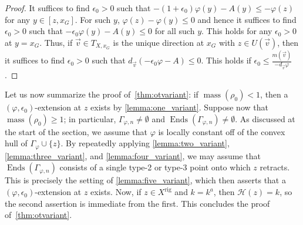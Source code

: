 \documentclass[10pt,reqno]{amsart}
\theoremstyle{plain}
\theoremstyle{definition}
\renewcommand{\H}{\mathcal{H}}
\numberwithin{equation}{section}
\DeclareMathOperator{\Ends}{Ends}
\DeclareMathOperator{\mass}{mass}
\DeclareMathOperator{\rig}{rig}
\begin{document}
\begin{proof}
It suffices to find $\epsilon_0 > 0$ such that $-(1+\epsilon_0)\varphi(y) -A(y) \leq -\varphi(z)$ for any $y \in [z,x_G]$. 
For such $y$, $\varphi(z) - \varphi(y) \leq 0$ and hence it suffices to find $\epsilon_0 > 0$ such that $-\epsilon_0 \varphi(y) - A(y) \leq 0$ for all such $y$.
This holds for any $\epsilon_0 > 0$ at $y= x_G$.
Thus, if $\vec{v} \in T_{X,x_G}$ is the unique direction at $x_G$ with $z \in U(\vec{v})$, then it suffices to find $\epsilon_0 > 0$ such that $d_{\vec{v}}\left( - \epsilon_0 \varphi - A \right) \leq 0$. This holds if $\epsilon_0 \leq \frac{m(\vec{v})}{-d_{\vec{v}} \varphi}$. 
\end{proof}

Let us now summarize the proof of~\cref{thm:otvariant}: 
if $\mass(\rho_0) < 1$, then a $(\varphi,\epsilon_0)$-extension at $z$ exists by \cref{lemma:one_variant}. Suppose now that $\mass(\rho_0) \geq 1$; in particular, $\Gamma_{\varphi,n} \not= \emptyset$ and $\Ends(\Gamma_{\varphi,n}) \not= \emptyset$. As discussed at the start of the section, we assume that $\varphi$ is locally constant off of the convex hull of $\Gamma_{\varphi} \cup \{ z \}$. By repeatedly applying \cref{lemma:two_variant},  \cref{lemma:three_variant}, and \cref{lemma:four_variant}, we may assume that $\Ends(\Gamma_{\varphi,n})$ consists of a single type-2 or type-3 point onto which $z$ retracts.
This is precisely the setting of \cref{lemma:five_variant}, which then asserts that a $(\varphi,\epsilon_0)$-extension at $z$ exists. Now, if $z \in X^{\rig}$ and $k = k^a$, then $\H(z) = k$, so the second assertion is immediate from the first. This concludes the proof of~\cref{thm:otvariant}.
\end{document}
